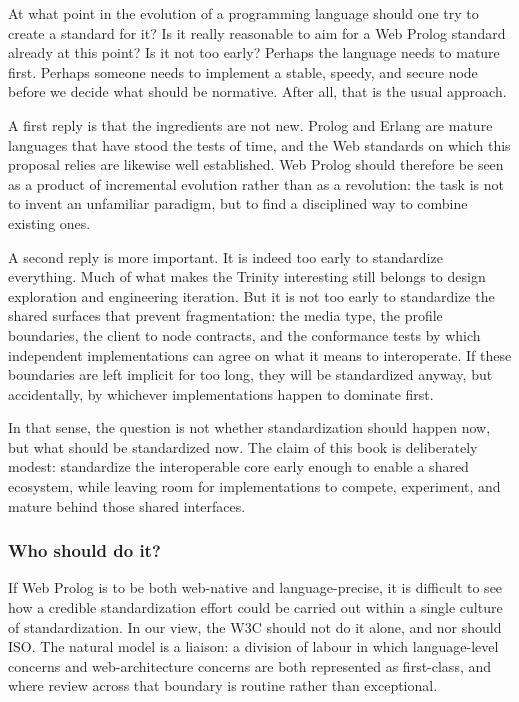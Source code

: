 \noindent At what point in the evolution of a programming language should one try to create a standard for it? Is it really reasonable to aim for a Web Prolog standard already at this point? Is it not too early? Perhaps the language needs to mature first. Perhaps someone needs to implement a stable, speedy, and secure node before we decide what should be normative. After all, that is the usual approach.

A first reply is that the ingredients are not new. Prolog and Erlang are mature languages that have stood the tests of time, and the Web standards on which this proposal relies are likewise well established. Web Prolog should therefore be seen as a product of incremental evolution rather than as a revolution: the task is not to invent an unfamiliar paradigm, but to find a disciplined way to combine existing ones.

A second reply is more important. It is indeed too early to standardize everything. Much of what makes the Trinity interesting still belongs to design exploration and engineering iteration. But it is not too early to standardize the shared surfaces that prevent fragmentation: the media type, the profile boundaries, the client to node contracts, and the conformance tests by which independent implementations can agree on what it means to interoperate. If these boundaries are left implicit for too long, they will be standardized anyway, but accidentally, by whichever implementations happen to dominate first.

In that sense, the question is not whether standardization should happen now, but what should be standardized now. The claim of this book is deliberately modest: standardize the interoperable core early enough to enable a shared ecosystem, while leaving room for implementations to compete, experiment, and mature behind those shared interfaces.

\subsubsection{Who should do it?}\label{sec:who-should-do-it}

If Web Prolog is to be both web-native and language-precise, it is difficult to see how a credible standardization effort could be carried out within a single culture of standardization. In our view, the W3C should not do it alone, and nor should ISO. The natural model is a liaison: a division of labour in which language-level concerns and web-architecture concerns are both represented as first-class, and where review across that boundary is routine rather than exceptional.

